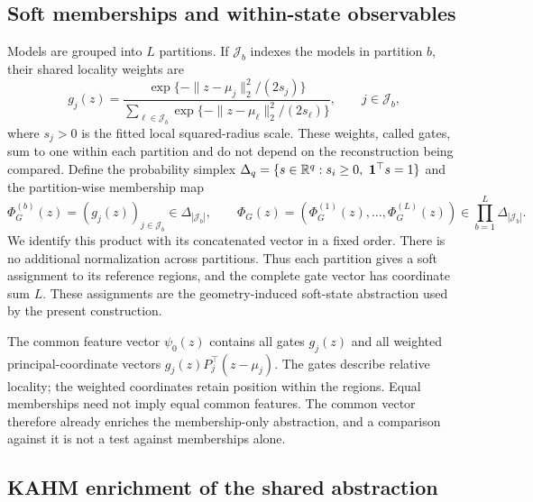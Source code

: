 \subsection{Soft memberships and within-state observables}

Models are grouped into $L$ partitions. If $\mathcal J_b$ indexes the
models in partition $b$, their shared locality weights are
\begin{equation}
 g_j(z)=\frac{\exp\{-\|z-\mu_j\|_2^2/(2s_j)\}}
 {\sum_{\ell\in\mathcal J_b}
       \exp\{-\|z-\mu_\ell\|_2^2/(2s_\ell)\}},
 \qquad j\in\mathcal J_b,
\label{eq:geometry-gates}
\end{equation}
where $s_j>0$ is the fitted local squared-radius scale. These weights,
called gates, sum to one within each partition and do not depend on the
reconstruction being compared. Define the probability simplex
$\Delta_q=\{s\in\mathbb{R}^q:s_i\geq0,\ \mathbf1^\top s=1\}$ and the
partition-wise membership map
\begin{equation}
 \Phi_G^{(b)}(z)=(g_j(z))_{j\in\mathcal J_b}\in\Delta_{|\mathcal J_b|},
 \qquad
 \Phi_G(z)=(\Phi_G^{(1)}(z),\ldots,\Phi_G^{(L)}(z))
 \in\prod_{b=1}^L\Delta_{|\mathcal J_b|}.
 \label{eq:geometry-soft-state}
\end{equation}
We identify this product with its concatenated vector in a fixed order.
There is no additional normalization across partitions. Thus each
partition gives a soft assignment to its reference regions, and the
complete gate vector has coordinate sum $L$. These assignments are the
geometry-induced soft-state abstraction used by the present construction.

The common feature vector $\psi_0(z)$ contains all gates $g_j(z)$ and
all weighted principal-coordinate vectors $g_j(z)P_j^\top(z-\mu_j)$.
The gates describe relative locality; the weighted coordinates retain
position within the regions. Equal memberships need not imply equal
common features. The common vector therefore already enriches the
membership-only abstraction, and a comparison against it is not a test
against memberships alone.

\subsection{KAHM enrichment of the shared abstraction}

